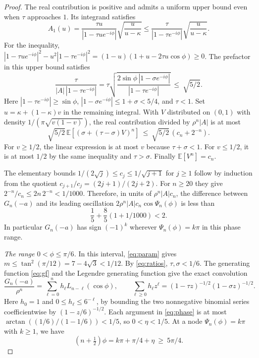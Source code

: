 \documentclass[11pt]{article}
\begin{document}
\begin{proof}
The real contribution is positive and admits a uniform upper bound even when $\tau$ approaches $1$. Its integrand satisfies
\[
A_1(u)=\frac{\tau u}{|1-\tau u e^{-i\phi}|}\sqrt{\frac{u}{u-\kappa}}
 \leq \frac{\tau}{|1-\tau e^{-i\phi}|}\sqrt{\frac{u}{u-\kappa}}.
\]
For the inequality, $ |1-\tau u e^{-i\phi}|^2-u^2|1-\tau e^{-i\phi}|^2
=(1-u)(1+u-2\tau u\cos\phi)\geq0$. The prefactor in this upper bound satisfies
\begin{equation}
\frac{\tau}{|A|\,|1-\tau e^{-i\phi}|}=\tau \sqrt{\frac{2\sin\phi\,|1-\sigma e^{-i\phi}|}{|1-\tau e^{-i\phi}|}}
 \ \leq\ \sqrt{5/2}.
\label{eq:real-prefactor}
\end{equation}
Here $|1-\tau e^{-i\phi}|\geq\sin\phi$, $|1-\sigma e^{-i\phi}|\leq1+\sigma<5/4$, and $\tau<1$. Set $u=\kappa+(1-\kappa)v$ in the remaining integral. With $V$ distributed on $(0,1)$ with density $1/(\pi\sqrt{v(1-v)})$, the real contribution divided by $\rho^n |A|$ is at most
\begin{equation}
\sqrt{5/2}\,\mathbb E[(\sigma+(\tau-\sigma)V)^n]
  \ \leq\ \sqrt{5/2}\,(c_n+2^{-n}).
\label{eq:arcsine}
\end{equation}
For $v\geq1/2$, the linear expression is at most $v$ because $\tau+\sigma<1$. For $v\leq1/2$, it is at most $1/2$ by the same inequality and $\tau>\sigma$. Finally $\mathbb E[V^n]=c_n$.

The elementary bounds $1/(2\sqrt j)\leq c_j\leq1/\sqrt{j+1}$ for $j\geq1$ follow by induction from the quotient $c_{j+1}/c_j=(2j+1)/(2j+2)$. For $n\geq20$ they give $2^{-n}/c_n\leq 2n\,2^{-n}<1/1000$. Therefore, in units of $\rho^n|A|c_n$, the difference between $G_n(-a)$ and its leading oscillation $2\rho^n|A|c_n\cos\Psi_n(\phi)$ is less than
\[
\frac15+\frac85(1+1/1000)<2.
\]
In particular $G_n(-a)$ has sign $(-1)^k$ wherever $\Psi_n(\phi)=k\pi$ in this phase range.

\medskip
\noindent\textit{The range \(0<\phi\le\pi/6\).}
In this interval, \eqref{eq:param} gives $m\leq\tan^2(\pi/12)=7-4\sqrt3<1/12$. By \eqref{eq:ratios}, $\tau,\sigma<1/6$. The generating function \eqref{eq:gf} and the Legendre generating function give the exact convolution
\begin{equation}
\frac{G_n(-a)}{\rho^n}=\sum_{\ell=0}^n h_\ell L_{n-\ell}(\cos\phi),\qquad
\sum_{\ell\geq0}h_\ell z^\ell=(1-\tau z)^{-1/2}(1-\sigma z)^{-1/2}.
\label{eq:legendre-conv}
\end{equation}
Here $h_0=1$ and $0\leq h_\ell\leq6^{-\ell}$, by bounding the two nonnegative binomial series coefficientwise by $(1-z/6)^{-1/2}$. Each argument in \eqref{eq:phase} is at most $\arctan((1/6)/(1-1/6))<1/5$, so $0<\eta<1/5$. At a node $\Psi_n(\phi)=k\pi$ with $k\geq1$, we have
\begin{equation}
(n+\tfrac12)\phi=k\pi+\pi/4+\eta\ \geq\ 5\pi/4.
\label{eq:node-lower-bound}
\end{equation}


\end{proof}
\end{document}
